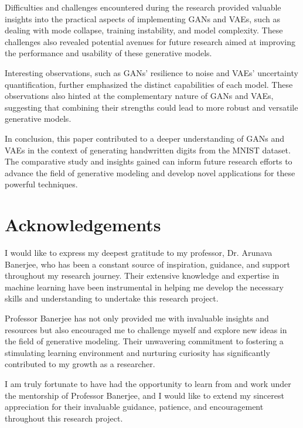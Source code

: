 \documentclass{article}
\begin{document}
Difficulties and challenges encountered during the research provided valuable insights into the practical aspects of implementing GANs and VAEs, such as dealing with mode collapse, training instability, and model complexity. These challenges also revealed potential avenues for future research aimed at improving the performance and usability of these generative models.

Interesting observations, such as GANs' resilience to noise and VAEs' uncertainty quantification, further emphasized the distinct capabilities of each model. These observations also hinted at the complementary nature of GANs and VAEs, suggesting that combining their strengths could lead to more robust and versatile generative models.

In conclusion, this paper contributed to a deeper understanding of GANs and VAEs in the context of generating handwritten digits from the MNIST dataset. The comparative study and insights gained can inform future research efforts to advance the field of generative modeling and develop novel applications for these powerful techniques.

\section*{Acknowledgements}
I would like to express my deepest gratitude to my professor, Dr. Arunava Banerjee, who has been a constant source of inspiration, guidance, and support throughout my research journey. Their extensive knowledge and expertise in machine learning have been instrumental in helping me develop the necessary skills and understanding to undertake this research project.

Professor Banerjee has not only provided me with invaluable insights and resources but also encouraged me to challenge myself and explore new ideas in the field of generative modeling. Their unwavering commitment to fostering a stimulating learning environment and nurturing curiosity has significantly contributed to my growth as a researcher.

I am truly fortunate to have had the opportunity to learn from and work under the mentorship of Professor Banerjee, and I would like to extend my sincerest appreciation for their invaluable guidance, patience, and encouragement throughout this research project.



\end{document}
